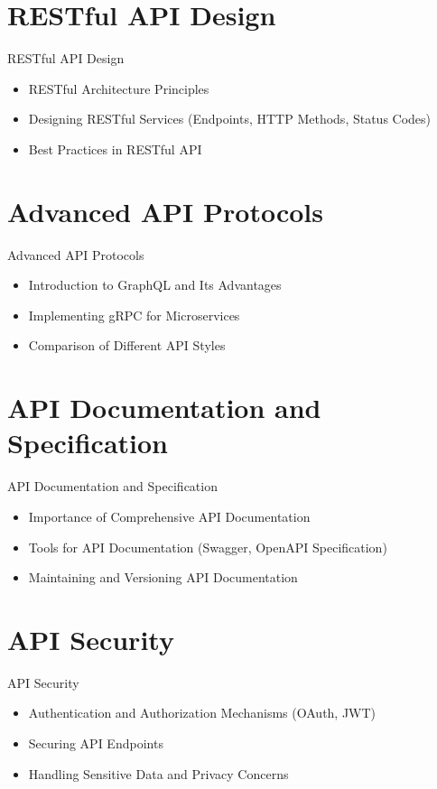 \documentclass{beamer}
\begin{document}
\section{RESTful API Design}
\begin{frame}{RESTful API Design}
  \begin{itemize}
    \item RESTful Architecture Principles
    \item Designing RESTful Services (Endpoints, HTTP Methods, Status Codes)
    \item Best Practices in RESTful API
  \end{itemize}
\end{frame}



\section{Advanced API Protocols}
\begin{frame}{Advanced API Protocols}
  \begin{itemize}
    \item Introduction to GraphQL and Its Advantages
    \item Implementing gRPC for Microservices
    \item Comparison of Different API Styles
  \end{itemize}
\end{frame}

\section{API Documentation and Specification}
\begin{frame}{API Documentation and Specification}
  \begin{itemize}
    \item Importance of Comprehensive API Documentation
    \item Tools for API Documentation (Swagger, OpenAPI Specification)
    \item Maintaining and Versioning API Documentation
  \end{itemize}
\end{frame}

\section{API Security}
\begin{frame}{API Security}
  \begin{itemize}
    \item Authentication and Authorization Mechanisms (OAuth, JWT)
    \item Securing API Endpoints
    \item Handling Sensitive Data and Privacy Concerns
  \end{itemize}
\end{frame}
\end{document}
